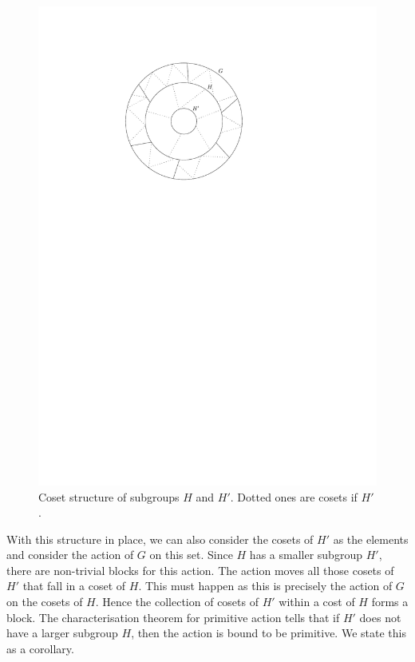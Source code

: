 \begin{figure}[htp!]
	\centering
	\includegraphics[scale=0.7]{images/coset}
	\caption{Coset structure of subgroups $H$ and $H'$. Dotted ones are
	cosets if $H'$.}
	\label{fig:coset}
\end{figure}

With this structure in place, we can also consider the cosets of $H'$ 
as the elements and consider the action of $G$ on this set. Since $H$ has a
smaller subgroup $H'$, there are non-trivial blocks for this action. The
action moves all those cosets of $H'$ that fall in a coset of $H$. This must
happen as this is precisely the action of $G$ on the cosets of $H$.
Hence the collection of cosets of $H'$ within a cost of $H$ forms a block.
The characterisation theorem for primitive action tells that if $H'$ does not
have a larger subgroup $H$, then the action is bound to be primitive. We state
this as a corollary.

